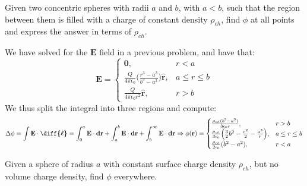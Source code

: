 \documentclass[crop=false,class=article,oneside]{standalone}
\begin{document}
        \begin{problem}[Wangsness 5-11]
            Given two concentric spheres with radii
            $a$ and $b$, with $a<b$, such that the region
            between them is filled with a charge of constant
            density $\rho_{ch}$, find $\phi$ at all points
            and express the answer in terms of $\rho_{ch}$.
        \end{problem}
            We have solved for the $\mathbf{E}$ field in
            a previous problem, and have that:
            \begin{equation*}
                \mathbf{E}
                =
                \begin{cases}
                    \mathbf{0},
                    &r<a\\
                    \frac{Q}{4\pi \epsilon_0}
                    \Big(\frac{r^3-a^3}{b^3-a^3}\Big)
                    \hat{\mathbf{r}},
                    &a\leq{r}\leq{b}\\
                    \frac{Q}{4\pi\epsilon_{0}r^{2}}
                    \hat{\mathbf{r}},
                    &r>b
                \end{cases}    
            \end{equation*}
            We thus split the integral
            into three regions and compute:
            \begin{equation*}
                \Delta\phi
                =\int\mathbf{E}\cdot\boldsymbol{\diff{\ell}}
                =\int_{0}^{a}\mathbf{E}\cdot\mathbf{dr}
                +\int_{a}^{b}\mathbf{E}\cdot\mathbf{dr}
                +\int_{b}^{\infty}\mathbf{E}\cdot \mathbf{dr}    
                \Rightarrow\phi(\mathbf{r})
                =
                \begin{cases}
                    \frac{\rho_{ch}(b^{3}-a^{3})}
                         {3\epsilon_{0}r},
                    &r>b\\
                    \frac{\rho_{ch}}{3\epsilon_{0}}\Big(
                        \frac{3}{2}b^{2}
                        -\frac{r^2}{2}
                        -\frac{a^3}{r}
                    \Big),&a\leq{r}\leq{b}\\
                    \frac{\rho_{ch}}{2\epsilon_0}(b^2-a^2),
                    &r<a
                \end{cases}
            \end{equation*}
        \begin{problem}[Wangsness 5-14]
            Given a sphere of radius $a$ with constant
            surface charge density $\rho_{ch}$, but no
            volume charge density, find $\phi$ everywhere.
        \end{problem}
\end{document}

